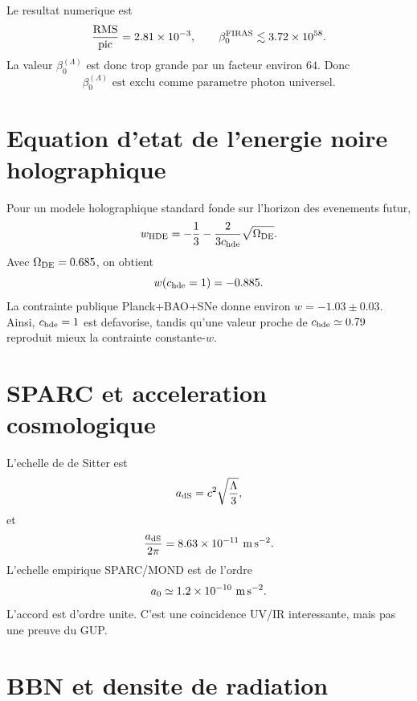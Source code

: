 \documentclass[11pt,a4paper]{article}
\begin{document}
Le resultat numerique est
\begin{equation}
\frac{\mathrm{RMS}}{\mathrm{pic}}=2.81\times10^{-3},
\qquad
\beta_0^{\rm FIRAS}\lesssim3.72\times10^{58}.
\end{equation}
La valeur $\beta_0^{(\Lambda)}$ est donc trop grande par un facteur environ
$64$. Donc
\begin{equation}
\boxed{
\beta_0^{(\Lambda)}\text{ est exclu comme parametre photon universel.}
}
\end{equation}

\section{Equation d'etat de l'energie noire holographique}

Pour un modele holographique standard fonde sur l'horizon des evenements futur,
\begin{equation}
w_{\rm HDE}
=
-\frac13-\frac{2}{3c_{\rm hde}}\sqrt{\Omega_{\rm DE}}.
\end{equation}
Avec $\Omega_{\rm DE}=0.685$, on obtient
\begin{equation}
w(c_{\rm hde}=1)=-0.885.
\end{equation}
La contrainte publique Planck+BAO+SNe donne environ $w=-1.03\pm0.03$. Ainsi,
$c_{\rm hde}=1$ est defavorise, tandis qu'une valeur proche de
$c_{\rm hde}\simeq0.79$ reproduit mieux la contrainte constante-$w$.

\section{SPARC et acceleration cosmologique}

L'echelle de de Sitter est
\begin{equation}
a_{\rm dS}=c^2\sqrt{\frac{\Lambda}{3}},
\end{equation}
et
\begin{equation}
\frac{a_{\rm dS}}{2\pi}=8.63\times10^{-11}~{\rm m\,s^{-2}}.
\end{equation}
L'echelle empirique SPARC/MOND est de l'ordre
\begin{equation}
a_0\simeq1.2\times10^{-10}~{\rm m\,s^{-2}}.
\end{equation}
L'accord est d'ordre unite. C'est une coincidence UV/IR interessante, mais pas
une preuve du GUP.

\section{BBN et densite de radiation}
\end{document}
